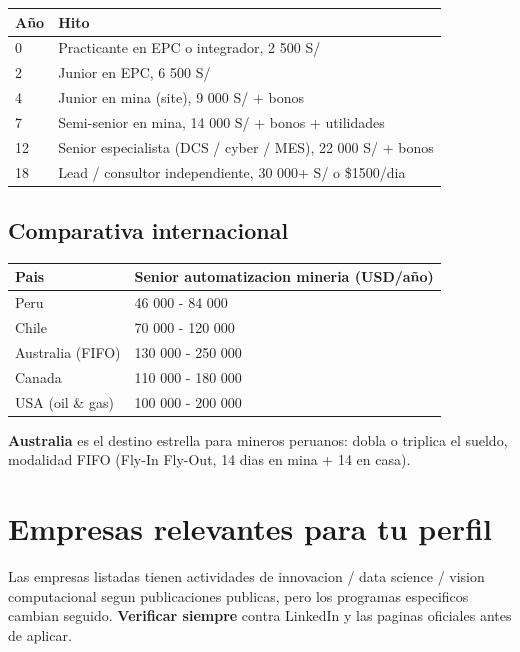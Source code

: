 \documentclass[11pt,a4paper,oneside]{report}
\begin{document}
\begin{center}
\begin{tabular}{ll}
\toprule
\textbf{Año} & \textbf{Hito} \\
\midrule
0   & Practicante en EPC o integrador, 2 500 S/ \\
2   & Junior en EPC, 6 500 S/ \\
4   & Junior en mina (site), 9 000 S/ + bonos \\
7   & Semi-senior en mina, 14 000 S/ + bonos + utilidades \\
12  & Senior especialista (DCS / cyber / MES), 22 000 S/ + bonos \\
18  & Lead / consultor independiente, 30 000+ S/ o \$1500/dia \\
\bottomrule
\end{tabular}
\end{center}

\section{Comparativa internacional}

\begin{center}
\begin{tabular}{ll}
\toprule
\textbf{Pais} & \textbf{Senior automatizacion mineria (USD/año)} \\
\midrule
Peru      & 46 000 - 84 000 \\
Chile     & 70 000 - 120 000 \\
Australia (FIFO) & 130 000 - 250 000 \\
Canada    & 110 000 - 180 000 \\
USA (oil \& gas) & 100 000 - 200 000 \\
\bottomrule
\end{tabular}
\end{center}

\textbf{Australia} es el destino estrella para mineros peruanos: dobla o
triplica el sueldo, modalidad FIFO (Fly-In Fly-Out, 14 dias en mina + 14 en
casa).

\chapter{Empresas relevantes para tu perfil}

\begin{advertencia}
Las empresas listadas tienen actividades de innovacion / data science /
vision computacional segun publicaciones publicas, pero los programas
especificos cambian seguido. \textbf{Verificar siempre} contra LinkedIn
y las paginas oficiales antes de aplicar.
\end{advertencia}
\end{document}
